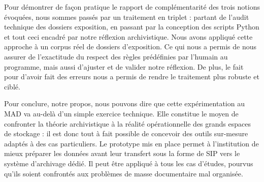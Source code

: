 Pour démontrer de façon pratique le rapport de complémentarité des trois notions évoquées, nous sommes passés par un traitement en triplet : partant de l'audit technique des dossiers exposition, en passant par la conception des scripts Python et tout ceci encadré par notre réflexion archivistique. Nous avons appliqué cette approche à un corpus réel de dossiers d'exposition. Ce qui nous a permis de nous assurer de l’exactitude du respect des règles prédéfinies par l'humain au programme, mais aussi d'ajuster et de valider notre réflexion. De plus, le fait pour d'avoir fait des erreurs nous a permis de rendre le traitement plus robuste et ciblé. 

Pour conclure, notre propos, nous pouvons dire que cette expérimentation au MAD va au-delà d'un simple exercice technique. Elle constitue le moyen de confronter la théorie archivistique à la réalité opérationnelle des grands espaces de stockage : il est donc tout à fait possible de concevoir des outils sur-mesure adaptés à des cas particuliers. Le prototype mis en place permet à l'institution de mieux préparer les données avant leur transfert sous la forme de SIP vers le système d'archivage dédié. Il peut être appliqué à tous les cas d'études, pourvus qu'ils soient confrontés aux problèmes de masse documentaire mal organisée.






